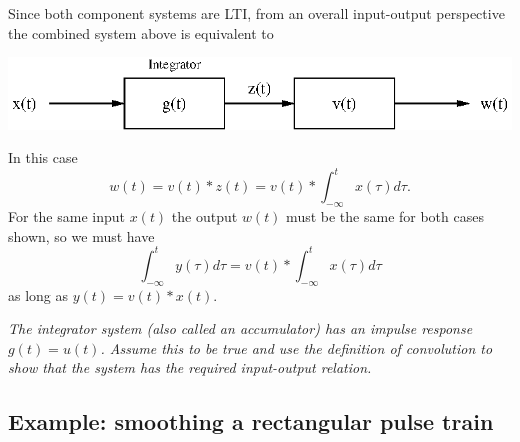 \documentclass[10pt]{beamer}
\newcommand{\conv}{\ast}
\begin{document}
Since both component systems are LTI, from an overall input-output perspective the combined system above is equivalent to
\begin{center}
  \includegraphics{integrationcascade}
\end{center}
In this case
\begin{equation*}
  w(t) = v(t) \conv z(t) = v(t) \conv \int_{-\infty}^t x(\tau) d\tau.
\end{equation*}
For the same input $x(t)$ the output $w(t)$ must be the same for both cases shown, so we must have
\begin{equation*}
  \int_{-\infty}^t y(\tau) d\tau = v(t) \conv \int_{-\infty}^t x(\tau) d\tau
\end{equation*}
as long as $y(t) = v(t) \conv x(t)$.

{\em The integrator system (also called an accumulator) has an impulse response $g(t) = u(t)$.  Assume this to be true and use the definition of convolution to show that the system has the required input-output relation.}

\subsection{Example:  smoothing a rectangular pulse train}
\end{document}

